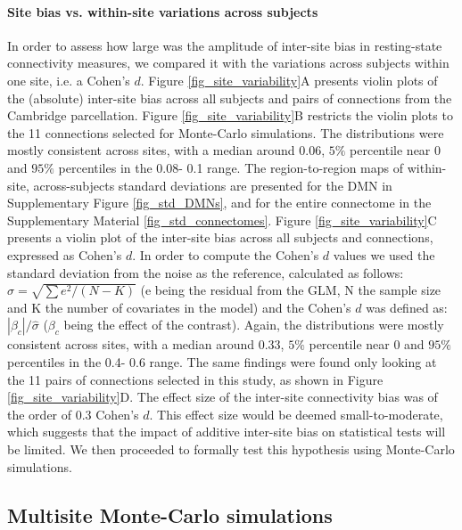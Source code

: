 \documentclass[authoryear]{elsarticle}
\begin{document}
\paragraph{Site bias vs. within-site variations across subjects} In order to
assess how large was the amplitude of inter-site bias in resting-state
connectivity measures, we compared it with the variations across subjects within
one site, i.e. a Cohen's $d$. Figure \ref{fig_site_variability}A presents violin
plots of the (absolute) inter-site bias across all subjects and pairs of
connections from the Cambridge parcellation. Figure \ref{fig_site_variability}B
restricts the violin plots to the 11 connections selected for Monte-Carlo
simulations. The distributions were mostly consistent across sites, with a
median around 0.06, $5\%$ percentile near 0 and $95\%$ percentiles in the 0.08-
0.1 range. The region-to-region maps of within-site, across-subjects standard
deviations are presented for the DMN in Supplementary Figure \ref{fig_std_DMNs},
and for the entire connectome in the Supplementary Material
\ref{fig_std_connectomes}. Figure \ref{fig_site_variability}C presents a violin
plot of the inter-site bias across all subjects and connections, expressed as
Cohen's $d$. In order to compute the Cohen's $d$ values we used the standard
deviation from the noise as the reference, calculated as follows:
$\hat{\sigma}=\sqrt{\sum{e^{2}}/(N-K)}$ (e being the residual from the GLM, N
the sample size and K the number of covariates in the model) and the Cohen's $d$
was defined as: $|\beta_c|/\hat{\sigma}$ ($\beta_c$ being the effect of the
contrast). Again, the distributions were mostly consistent across sites, with a
median around 0.33, $5\%$ percentile near 0 and $95\%$ percentiles in the 0.4-
0.6 range. The same findings were found only looking at the 11 pairs of
connections selected in this study, as shown in Figure
\ref{fig_site_variability}D. The effect size of the inter-site connectivity bias
was of the order of 0.3 Cohen's $d$. This effect size would be deemed small-to-moderate,
which suggests that the impact of additive inter-site bias on
statistical tests will be limited. We then proceeded to formally test this
hypothesis using Monte-Carlo simulations.

\subsection{Multisite Monte-Carlo simulations}
\end{document}
